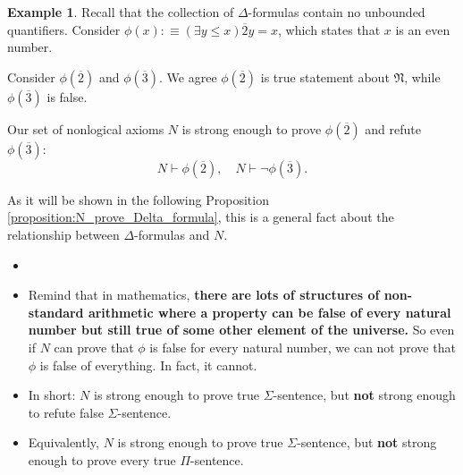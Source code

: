 \documentclass[11pt,letterpaper]{book}
\theoremstyle{definition}
\newtheorem{example}{Example}[section]
\begin{document}
\begin{example}

Recall that the collection of $\Delta$-formulas contain no unbounded
quantifiers. Consider $\phi(x) :\equiv (\exists y \leq x ) \overline{2}
y = x$, which states that $x$ is an even number.

Consider $\phi(\overline{2})$ and $\phi(\overline{3})$. We agree
$\phi(\overline{2})$ is true statement about $\mathfrak{N}$, while
$\phi(\overline{3})$ is false.

Our set of nonlogical axioms $N$ is strong enough to prove
$\phi(\overline{2})$ and refute $\phi(\overline{3})$:
$$ N \vdash \phi(\overline{2}), \quad N \vdash \lnot \phi(\overline{3}) . $$

As it will be shown in the following Proposition \ref{proposition:N_prove_Delta_formula}, this is a general fact about the relationship between $\Delta$-formulas
and $N$.

\end{example}



\begin{itemize}
\item[]
\item{Remind that in mathematics, \textbf{there are lots of structures of
non-standard arithmetic where a property can be false of every natural
number but still true of some other element of the universe.} So even if
$N$ can prove that $\phi$ is false for every natural number, we can not
prove that $\phi$ is false of everything. In fact, it cannot.}
\item{In short: $N$ is strong enough to prove true $\Sigma$-sentence,
but \textbf{not} strong enough to refute false $\Sigma$-sentence.}
\item{Equivalently, $N$ is strong enough to prove true
$\Sigma$-sentence, but \textbf{not} strong enough to prove every true
$\Pi$-sentence.}
\end{itemize}
\end{document}
